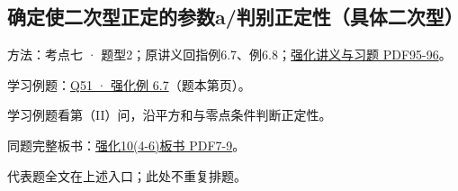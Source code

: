 \documentclass[UTF8,fontset=fandol,11pt,a4paper]{ctexart}
\newcommand{\source}[1]{{\footnotesize\color{Muted}#1\par}}
\begin{document}
\subsection*{确定使二次型正定的参数a/判别正定性（具体二次型）}
\hypertarget{node-E2}{}
方法：考点七 · 题型2；原讲义回指例6.7、例6.8；\href{file:///Users/skyintelligence/Desktop/\%E5\%BE\%97\%E8\%AF\%BB\%E4\%B8\%AA\%E7\%A0\%94-\%E5\%8C\%97\%E5\%A4\%A7\%E8\%BD\%AF\%E5\%BE\%AE/\%E6\%95\%B0\%E5\%AD\%A6\%20150/Kira\%C2\%B727\%E7\%BA\%BF\%E6\%80\%A7\%E4\%BB\%A3\%E6\%95\%B0\%E5\%BC\%BA\%E5\%8C\%96\%E8\%AE\%B2\%E4\%B9\%89\%2B\%E4\%B9\%A0\%E9\%A2\%98.pdf\#page=95}{强化讲义与习题 PDF95-96}。\par
学习例题：\hyperlink{R-EX-07}{Q51 · 强化例 6.7}（题本第\pageref*{R-EX-07}页）。\par
\source{学习例题看第（II）问，沿平方和与零点条件判断正定性。}
同题完整板书：\href{file:///Users/skyintelligence/Desktop/\%E5\%BE\%97\%E8\%AF\%BB\%E4\%B8\%AA\%E7\%A0\%94-\%E5\%8C\%97\%E5\%A4\%A7\%E8\%BD\%AF\%E5\%BE\%AE/\%E6\%95\%B0\%E5\%AD\%A6\%20150/\%E7\%BA\%BF\%E6\%80\%A7\%E4\%BB\%A3\%E6\%95\%B0/\%E7\%BA\%BF\%E4\%BB\%A3\%E5\%BC\%BA\%E5\%8C\%9610\%284-6\%29\%20\%20\%E7\%AC\%AC\%E5\%85\%AD\%E7\%AB\%A0\%20\%E4\%BA\%8C\%E6\%AC\%A1\%E5\%9E\%8B2\%E3\%80\%90\%E4\%BE\%8B6.5\%E3\%80\%91-\%E3\%80\%90\%E4\%BE\%8B6.13\%E3\%80\%91.pdf\#page=7}{强化10(4-6)板书 PDF7-9}。\par
\vspace{3mm}
\source{代表题全文在上述入口；此处不重复排题。}
\end{document}
